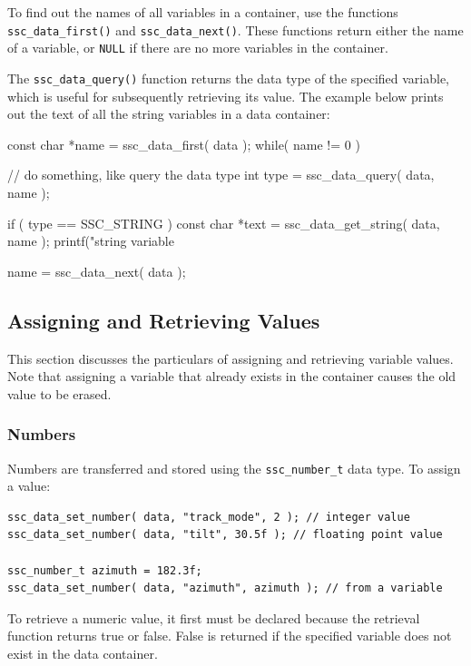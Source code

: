\documentclass{article}
\begin{document}
To find out the names of all variables in a container, use the functions \texttt{ssc\_data\_first()} and \texttt{ssc\_data\_next()}.  These functions return either the name of a variable, or \texttt{NULL} if there are no more variables in the container. 

The \texttt{ssc\_data\_query()} function returns the data type of the specified variable, which is useful for subsequently retrieving its value.  The example below prints out the text of all the string variables in a data container:

\begin{verbatimtab}[4]
const char *name = ssc_data_first( data );
while( name != 0 )
{
	// do something, like query the data type
	int type = ssc_data_query( data, name );

	if ( type == SSC_STRING )
	{
		const char *text = ssc_data_get_string( data, name );
		printf("string variable %
	}

	name = ssc_data_next( data );
}
\end{verbatimtab}

\subsection{Assigning and Retrieving Values}

This section discusses the particulars of assigning and retrieving variable values.  Note that assigning a variable that already exists in the container causes the old value to be erased.

\subsubsection{Numbers}

Numbers are transferred and stored using the \texttt{ssc\_number\_t} data type.  To assign a value:

\begin{verbatim}
ssc_data_set_number( data, "track_mode", 2 ); // integer value
ssc_data_set_number( data, "tilt", 30.5f ); // floating point value

ssc_number_t azimuth = 182.3f;
ssc_data_set_number( data, "azimuth", azimuth ); // from a variable
\end{verbatim}

To retrieve a numeric value, it first must be declared because the retrieval function returns true or false.  False is returned if the specified variable does not exist in the data container.
\end{document}
